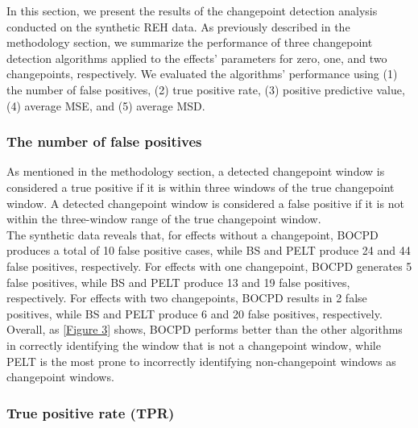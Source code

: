 \documentclass[]{interact}
\theoremstyle{plain}%
\theoremstyle{definition}
\theoremstyle{remark}
\begin{document}
{	\hspace{0.28cm} In this section, we present the results of the changepoint detection analysis conducted on the synthetic REH data. As previously described in the methodology section, we summarize the performance of three changepoint detection algorithms applied to the effects' parameters for zero, one, and two changepoints, respectively. We evaluated the algorithms' performance using (1) the number of false positives, (2) true positive rate, (3) positive predictive value, (4) average MSE, and (5) average MSD.
	
	\subsubsection{The number of false positives}
	
	\hspace{0.28cm} As mentioned in the methodology section, a detected changepoint window is considered a true positive if it is within three windows of the true changepoint window. A detected changepoint window is considered a false positive if it is not within the three-window range of the true changepoint window. \\
	
	The synthetic data reveals that, for effects without a changepoint, BOCPD produces a total of 10 false positive cases, while BS and PELT produce 24 and 44 false positives, respectively. For effects with one changepoint, BOCPD generates 5 false positives, while BS and PELT produce 13 and 19 false positives, respectively. For effects with two changepoints, BOCPD results in 2 false positives, while BS and PELT produce 6 and 20 false positives, respectively. Overall, as \autoref{Figure 3} shows, BOCPD performs better than the other algorithms in correctly identifying the window that is not a changepoint window, while PELT is the most prone to incorrectly identifying non-changepoint windows as changepoint windows.
	
	\subsubsection{True positive rate (TPR)}
	
}
\end{document}
